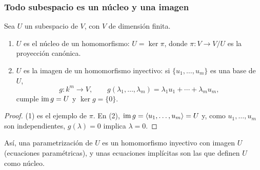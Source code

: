 \begin{frame}[allowframebreaks, t]
    \frametitle{Todo subespacio es un núcleo y una imagen}

    \begin{proposition}
        Sea $U$ un subespacio de $V$, con $V$ de dimensión finita.
        \begin{enumerate}[(1)]
            \item $U$ es el \alert{núcleo} de un homomorfismo: $U=\ker\pi$,
            donde $\pi\colon V\to V/U$ es la proyección canónica.
            \item $U$ es la \alert{imagen} de un homomorfismo inyectivo: si
            $\{u_1,\ldots,u_m\}$ es una base de $U$,
            \[
                g\colon k^m\to V,\qquad
                g(\lambda_1,\ldots,\lambda_m)=\lambda_1u_1+\cdots+\lambda_mu_m,
            \]
            cumple $\operatorname{im} g=U$ y $\ker g=\{0\}$.
        \end{enumerate}
    \end{proposition}

    \begin{proof}
        (1) es el ejemplo de $\pi$. En (2), $\operatorname{im} g=\langle u_1,\ldots,u_m\rangle=U$
        y, como $u_1,\ldots,u_m$ son independientes, $g(\lambda)=0$ implica
        $\lambda=0$.
    \end{proof}

    \medskip

    Así, una \alert{parametrización} de $U$ es un homomorfismo inyectivo
    con imagen $U$ (ecuaciones paramétricas), y unas \alert{ecuaciones
    implícitas} son las que definen $U$ como núcleo.
\end{frame}
